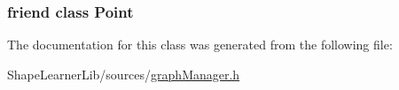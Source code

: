 \subsubsection[{Point}]{\setlength{\rightskip}{0pt plus 5cm}friend class {\bf Point}\hspace{0.3cm}{\ttfamily [friend]}}\label{class_graph_manager_1_1_object_interface_aa238d52f825b8ea8da6a5c4ae1b8d482}


The documentation for this class was generated from the following file\+:\begin{DoxyCompactItemize}
\item 
Shape\+Learner\+Lib/sources/\hyperlink{graph_manager_8h}{graph\+Manager.\+h}\end{DoxyCompactItemize}
